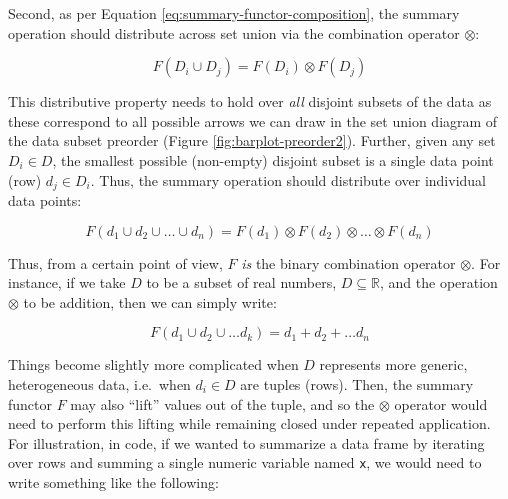 \documentclass[
  openany]{book}
\newenvironment{Shaded}{\begin{snugshade}}{\end{snugshade}}
\newcommand{\AttributeTok}[1]{\textcolor[rgb]{0.13,0.29,0.53}{#1}}
\newcommand{\CommentTok}[1]{\textcolor[rgb]{0.56,0.35,0.01}{\textit{#1}}}
\newcommand{\ControlFlowTok}[1]{\textcolor[rgb]{0.13,0.29,0.53}{\textbf{#1}}}
\newcommand{\DecValTok}[1]{\textcolor[rgb]{0.00,0.00,0.81}{#1}}
\newcommand{\FunctionTok}[1]{\textcolor[rgb]{0.13,0.29,0.53}{\textbf{#1}}}
\newcommand{\NormalTok}[1]{#1}
\newcommand{\OtherTok}[1]{\textcolor[rgb]{0.56,0.35,0.01}{#1}}
\newcommand{\SpecialCharTok}[1]{\textcolor[rgb]{0.81,0.36,0.00}{\textbf{#1}}}
\theoremstyle{definition}
\theoremstyle{definition}
\theoremstyle{definition}
\theoremstyle{definition}
\theoremstyle{remark}
\begin{document}
Second, as per Equation \eqref{eq:summary-functor-composition}, the summary operation should distribute across set union via the combination operator \(\otimes\):

\[F(D_i \cup D_j) = F(D_i) \otimes F(D_j)\]

This distributive property needs to hold over \emph{all} disjoint subsets of the data as these correspond to all possible arrows we can draw in the set union diagram of the data subset preorder (Figure \ref{fig:barplot-preorder2}). Further, given any set \(D_i \in D\), the smallest possible (non-empty) disjoint subset is a single data point (row) \(d_j \in D_i\). Thus, the summary operation should distribute over individual data points:

\[F(d_1 \cup d_2 \cup \ldots \cup d_n) = F(d_1) \otimes F(d_2) \otimes \ldots \otimes F(d_n)\]

Thus, from a certain point of view, \(F\) \emph{is} the binary combination operator \(\otimes\). For instance, if we take \(D\) to be a subset of real numbers, \(D \subseteq \mathbb{R}\), and the operation \(\otimes\) to be addition, then we can simply write:

\[F(d_1 \cup d_2 \cup \ldots d_k) = d_1 + d_2 + \ldots d_n\]

Things become slightly more complicated when \(D\) represents more generic, heterogeneous data, i.e.~when \(d_i \in D\) are tuples (rows). Then, the summary functor \(F\) may also ``lift'' values out of the tuple, and so the \(\otimes\) operator would need to perform this lifting while remaining closed under repeated application. For illustration, in code, if we wanted to summarize a data frame by iterating over rows and summing a single numeric variable named \texttt{x}, we would need to write something like the following:

\begin{Shaded}
\end{Shaded}
\end{document}
